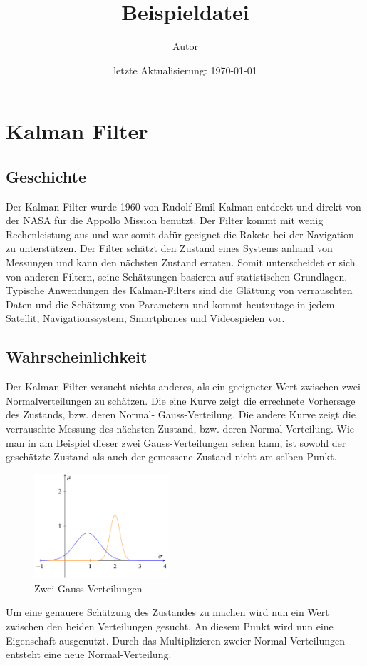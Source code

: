 \documentclass[11pt,a4paper]{article}
\title{\bf {Beispieldatei}}
\author{\vspace{2cm}
  Autor}
\date{\vspace{3cm} %
      letzte Aktualisierung: \today}
\begin{document}
\section{Kalman Filter}
\subsection{Geschichte}
Der Kalman Filter wurde 1960 von Rudolf Emil Kalman entdeckt und direkt von der NASA für die Appollo Mission benutzt. Der Filter kommt mit wenig Rechenleistung aus und war somit dafür geeignet die Rakete bei der Navigation zu unterstützen. Der Filter schätzt den Zustand eines Systems anhand von Messungen und kann den nächsten Zustand erraten. Somit unterscheidet er sich von anderen Filtern, seine Schätzungen basieren auf statistischen Grundlagen. Typische Anwendungen des Kalman-Filters sind die Glättung von verrauschten Daten und die Schätzung von Parametern und kommt heutzutage in jedem Satellit, Navigationssystem, Smartphones und Videospielen vor.

\subsection{Wahrscheinlichkeit}
Der Kalman Filter versucht nichts anderes, als ein geeigneter Wert zwischen zwei Normalverteilungen zu schätzen. Die eine Kurve zeigt die errechnete Vorhersage des Zustands, bzw. deren Normal- Gauss-Verteilung. Die andere Kurve zeigt die verrauschte Messung des nächsten Zustand, bzw. deren Normal-Verteilung. Wie man in am Beispiel dieser zwei Gauss-Verteilungen sehen kann, ist sowohl der geschätzte Zustand als auch der gemessene Zustand nicht am selben Punkt. 

\begin{figure}[h]
 \begin{center}
 \includegraphics[width=5cm]{papers/erdbeben/Gausskurve2}
 \caption{Zwei Gauss-Verteilungen}
 \end{center}
\end{figure}
Um eine genauere Schätzung des Zustandes zu machen wird nun ein Wert zwischen den beiden Verteilungen gesucht. An diesem Punkt wird nun eine Eigenschaft ausgenutzt. Durch das Multiplizieren zweier Normal-Verteilungen entsteht eine neue Normal-Verteilung. 
\end{document}
